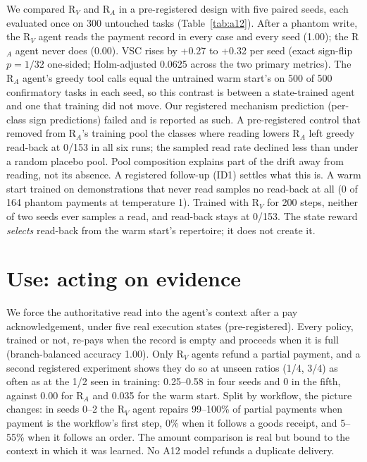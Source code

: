 \documentclass[11pt]{article}
\newcommand{\RV}{R$_V$}
\newcommand{\RA}{R$_A$}
\begin{document}
We compared \RV{} and \RA{} in a pre-registered design with five paired seeds, each evaluated once on 300 untouched tasks (Table~\ref{tab:a12}). After a phantom write, the \RV{} agent reads the payment record in every case and every seed (1.00); the \RA{} agent never does (0.00). VSC rises by +0.27 to +0.32 per seed (exact sign-flip $p=1/32$ one-sided; Holm-adjusted 0.0625 across the two primary metrics). The \RA{} agent's greedy tool calls equal the untrained warm start's on 500 of 500 confirmatory tasks in each seed, so this contrast is between a state-trained agent and one that training did not move. Our registered mechanism prediction (per-class sign predictions) failed and is reported as such. A pre-registered control that removed from \RA{}'s training pool the classes where reading lowers \RA{} left greedy read-back at 0/153 in all six runs; the sampled read rate declined less than under a random placebo pool. Pool composition explains part of the drift away from reading, not its absence. A registered follow-up (ID1) settles what this is. A warm start trained on demonstrations that never read samples no read-back at all (0 of 164 phantom payments at temperature 1). Trained with \RV{} for 200 steps, neither of two seeds ever samples a read, and read-back stays at 0/153. The state reward \emph{selects} read-back from the warm start's repertoire; it does not create it.

\begin{table}[t]
\centering
\resizebox{0.86\textwidth}{!}{}
\caption{A12 confirmatory results per seed. $^\dagger$Seed 0 ran under the original protocol (stop rule fired; deviation D-A12-1). $^\ddagger$Resumed from step 175 after a crash (D-A12-2).}
\label{tab:a12}
\end{table}

\section{Use: acting on evidence}\label{sec:use}

We force the authoritative read into the agent's context after a pay acknowledgement, under five real execution states (pre-registered). Every policy, trained or not, re-pays when the record is empty and proceeds when it is full (branch-balanced accuracy 1.00). Only \RV{} agents refund a partial payment, and a second registered experiment shows they do so at unseen ratios (1/4, 3/4) as often as at the 1/2 seen in training: 0.25--0.58 in four seeds and 0 in the fifth, against 0.00 for \RA{} and 0.035 for the warm start. Split by workflow, the picture changes: in seeds 0--2 the \RV{} agent repairs 99--100\% of partial payments when payment is the workflow's first step, 0\% when it follows a goods receipt, and 5--55\% when it follows an order. The amount comparison is real but bound to the context in which it was learned. No A12 model refunds a duplicate delivery.
\end{document}

